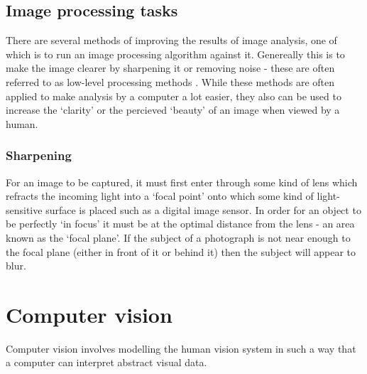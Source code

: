 \documentclass[a4paper,12pt]{article}
\begin{document}
  \subsection{Image processing tasks}
    There are several methods of improving the results of image analysis, one of which is to run an image processing algorithm against it. Genereally this is to make the image clearer by sharpening it or removing noise - these are often referred to as low-level processing methods \citep{sonka2014image}. While these methods are often applied to make analysis by a computer a lot easier, they also can be used to increase the ‘clarity’ or the percieved ‘beauty’ of an image when viewed by a human.

    \subsubsection{Sharpening}
      For an image to be captured, it must first enter through some kind of lens which refracts the incoming light into a ‘focal point’ onto which some kind of light-sensitive surface is placed such as a digital image sensor. In order for an object to be perfectly ‘in focus’ it must be at the optimal distance from the lens - an area known as the ‘focal plane’. If the subject of a photograph is not near enough to the focal plane (either in front of it or behind it) then the subject will appear to blur.

\section{Computer vision}
  Computer vision involves modelling the human vision system in such a way that a computer can interpret abstract visual data.



\end{document}
